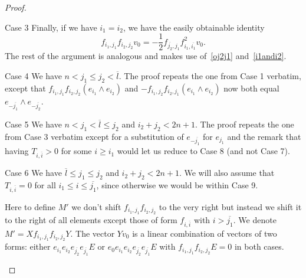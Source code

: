 \documentclass[10pt,a4paper]{article}
\theoremstyle{remark}\newtheorem{rema}[theo]{Remark}
\newenvironment{enonce*}[2][]{\par\smallskip\noindent\textbf{#2.}\ }{\par\smallskip}
\begin{document}
\begin{proof}
\begin{enonce*}[remark]{Case 3}
Finally, if we have $i_1=i_2$, we have the easily obtainable identity
\[
f_{i_1,j_1}f_{i_2,j_2}v_0=-\frac12f_{\overline{j_2},j_1}f_{i_1,\overline{i_1}}^2v_0.
\]
The rest of the argument is analogous and makes use of~\eqref{oj2j1} and~\eqref{i1andi2}.
\end{enonce*}


\begin{enonce*}[remark]{Case 4} We have $n<j_1\le j_2<\overline l$. The proof repeats the one from Case 1 verbatim, except that $f_{i_1,j_1}f_{i_2,j_2}(e_{i_1}\wedge e_{i_2})$ and $-f_{i_1,j_2}f_{i_2,j_1}(e_{i_1}\wedge e_{i_2})$ now both equal $e_{-\overline{j_1}}\wedge e_{-\overline{j_2}}$.
\end{enonce*}

\begin{enonce*}[remark]{Case 5} We have $n<j_1<\overline l\le j_2$ and $i_2+j_2<2n+1$. The proof repeats the one from Case 3 verbatim except for a substitution of $e_{-\overline{j_1}}$ for $e_{j_1}$ and the remark that having $T_{i,\overline i}>0$ for some $i\ge i_1$ would let us reduce to Case 8 (and not Case 7).
\end{enonce*}

\begin{enonce*}[remark]{Case 6} We have $\overline l\le j_1\le j_2$ and $i_2+j_2<2n+1$. We will also assume that $T_{i,\overline i}=0$ for all $i_1\le i\le \overline{j_1}$, since otherwise we would be within Case 9.

Here to define $M'$ we don't shift $f_{i_1,j_1}f_{i_2,j_2}$ to the very right but instead we shift it to the right of all elements except those of form $f_{i,\overline i}$ with $i>\overline{j_1}$. We denote $M'=Xf_{i_1,j_1}f_{i_2,j_2}Y$. The vector $Yv_0$ is a linear combination of vectors of two forms: either $e_{i_1}e_{i_2}e_{\overline{j_2}}e_{\overline{j_1}}E$ or $e_0e_{i_1}e_{i_2}e_{\overline{j_2}}e_{\overline{j_1}}E$ with $f_{i_1,j_1}f_{i_2,j_2}E=0$ in both cases.


\end{enonce*}
\end{proof}
\end{document}
